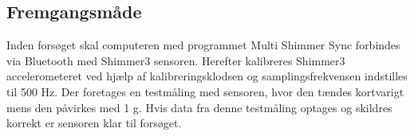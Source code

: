 \subsection{Fremgangsmåde}
Inden forsøget skal computeren med programmet Multi Shimmer Sync forbindes via Bluetooth med Shimmer3 sensoren. Herefter kalibreres Shimmer3 accelerometeret ved hjælp af kalibreringsklodsen og samplingsfrekvensen indstilles til 500 Hz. %
Der foretages en testmåling med sensoren, hvor den tændes kortvarigt mens den påvirkes med 1 g. Hvis data fra denne testmåling optages og skildres korrekt er sensoren klar til forsøget.

